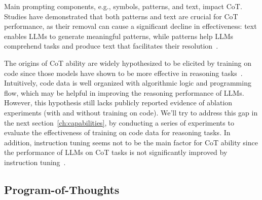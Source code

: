 Main prompting components, e.g., symbols, patterns, and text, impact CoT\@.
Studies have demonstrated that both patterns and text are crucial for CoT performance, as their removal can cause a significant decline in effectiveness: text enables LLMs to generate meaningful patterns, while patterns help LLMs comprehend tasks and produce text that facilitates their resolution~\cite{madaan2022text}.

The origins of CoT ability are widely hypothesized to be elicited by training on code since those models have shown to be more effective in reasoning tasks~\cite{fu2022gptroadmap, liang2022holistic}.
Intuitively, code data is well organized with algorithmic logic and programming flow, which may be helpful in improving the reasoning performance of LLMs. However, this hypothesis still lacks publicly reported evidence of ablation experiments (with and without training on code).
We'll try to address this gap in the next section~\ref{ch:capabilities}, by conducting a series of experiments to evaluate the effectiveness of training on code data for reasoning tasks.
In addition, instruction tuning seems not to be the main factor for CoT ability since the performance of LLMs on CoT tasks is not significantly improved by instruction tuning~\cite{chung2022scaling}.

\subsection{Program-of-Thoughts}
\label{sec:program-of-thoughts}

